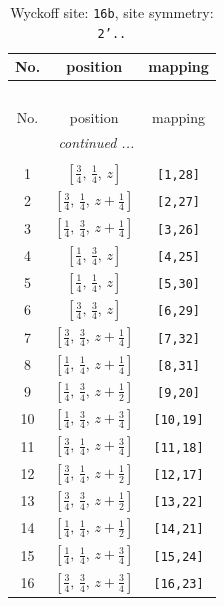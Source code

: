 \documentclass[fleqn,8pt]{jsarticle}
\begin{document}
\begin{longtable}{ccc}
\caption{Wyckoff site: {\tt 16b}, site symmetry: {\tt 2'..}}
 \\
 \hline \hline
No. & position & mapping \\ \hline \endfirsthead

\multicolumn{2}{l}{\tablename\ \thetable{}} \\
 \hline \hline
No. & position & mapping \\ \hline \endhead

 \hline \hline
\multicolumn{2}{r}{\footnotesize\it continued ...} \\ \endfoot

 \hline \hline
\multicolumn{2}{r}{} \\ \endlastfoot

1 & $\left[ \frac{3}{4},\, \frac{1}{4},\, z \right]$ & {\tt [1,28]} \\ \hline
2 & $\left[ \frac{3}{4},\, \frac{1}{4},\, z + \frac{1}{4} \right]$ & {\tt [2,27]} \\ \hline
3 & $\left[ \frac{1}{4},\, \frac{3}{4},\, z + \frac{1}{4} \right]$ & {\tt [3,26]} \\ \hline
4 & $\left[ \frac{1}{4},\, \frac{3}{4},\, z \right]$ & {\tt [4,25]} \\ \hline
5 & $\left[ \frac{1}{4},\, \frac{1}{4},\, z \right]$ & {\tt [5,30]} \\ \hline
6 & $\left[ \frac{3}{4},\, \frac{3}{4},\, z \right]$ & {\tt [6,29]} \\ \hline
7 & $\left[ \frac{3}{4},\, \frac{3}{4},\, z + \frac{1}{4} \right]$ & {\tt [7,32]} \\ \hline
8 & $\left[ \frac{1}{4},\, \frac{1}{4},\, z + \frac{1}{4} \right]$ & {\tt [8,31]} \\ \hline
9 & $\left[ \frac{1}{4},\, \frac{3}{4},\, z + \frac{1}{2} \right]$ & {\tt [9,20]} \\ \hline
10 & $\left[ \frac{1}{4},\, \frac{3}{4},\, z + \frac{3}{4} \right]$ & {\tt [10,19]} \\ \hline
11 & $\left[ \frac{3}{4},\, \frac{1}{4},\, z + \frac{3}{4} \right]$ & {\tt [11,18]} \\ \hline
12 & $\left[ \frac{3}{4},\, \frac{1}{4},\, z + \frac{1}{2} \right]$ & {\tt [12,17]} \\ \hline
13 & $\left[ \frac{3}{4},\, \frac{3}{4},\, z + \frac{1}{2} \right]$ & {\tt [13,22]} \\ \hline
14 & $\left[ \frac{1}{4},\, \frac{1}{4},\, z + \frac{1}{2} \right]$ & {\tt [14,21]} \\ \hline
15 & $\left[ \frac{1}{4},\, \frac{1}{4},\, z + \frac{3}{4} \right]$ & {\tt [15,24]} \\ \hline
16 & $\left[ \frac{3}{4},\, \frac{3}{4},\, z + \frac{3}{4} \right]$ & {\tt [16,23]} \\
\end{longtable}
\end{document}
